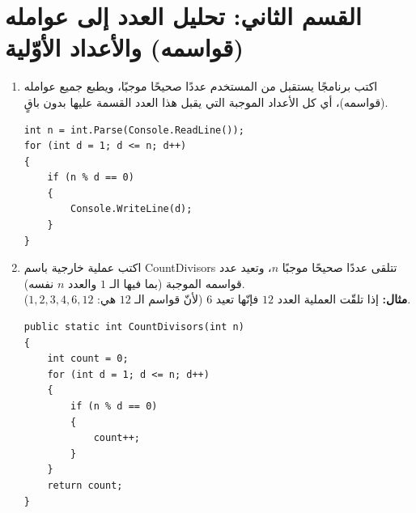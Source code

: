 \documentclass[14pt]{extarticle}
\begin{document}



\clearpage
\section*{القسم الثاني: تحليل العدد إلى عوامله (قواسمه) والأعداد الأوّلية}

\begin{enumerate}[resume, itemsep=2em]

\item اكتب برنامجًا يستقبل من المستخدم عددًا صحيحًا موجبًا، ويطبع جميع عوامله (قواسمه)، أي كل الأعداد الموجبة التي يقبل هذا العدد القسمة عليها بدون باقٍ.
\ifwithsols
\begin{boxSolution}
\begin{english}
\begin{verbatim}
int n = int.Parse(Console.ReadLine());
for (int d = 1; d <= n; d++)
{
    if (n % d == 0)
    {
        Console.WriteLine(d);
    }
}
\end{verbatim}
\end{english}
\end{boxSolution}
\fi
\filbreak

\item اكتب عملية خارجية باسم \textenglish{CountDivisors} تتلقى عددًا صحيحًا موجبًا $n$، وتعيد عدد قواسمه الموجبة (بما فيها الـ $1$ والعدد $n$ نفسه). \\
\textbf{مثال:} إذا تلقّت العملية العدد $12$ فإنّها تعيد $6$ (لأنّ قواسم الـ $12$ هي: $1, 2, 3, 4, 6, 12$).
\ifwithsols
\begin{boxSolution}
\begin{english}
\begin{verbatim}
public static int CountDivisors(int n)
{
    int count = 0;
    for (int d = 1; d <= n; d++)
    {
        if (n % d == 0)
        {
            count++;
        }
    }
    return count;
}
\end{verbatim}
\end{english}
\end{boxSolution}
\fi
\filbreak


\end{enumerate}
\end{document}

